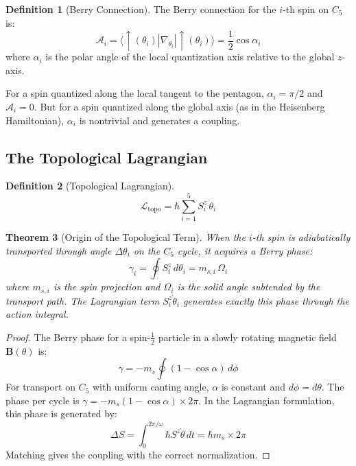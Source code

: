 \documentclass[11pt,a4paper]{article}
\newtheorem{theorem}{Theorem}[section]
\theoremstyle{definition}
\newtheorem{definition}[theorem]{Definition}
\theoremstyle{remark}
\newcommand{\LL}{\mathcal{L}}
\begin{document}
\begin{definition}[Berry Connection]
\label{def:berry}
The Berry connection for the $i$-th spin on $C_5$ is:
\begin{equation}
\mathcal{A}_i = \langle \uparrow(\theta_i) | \nabla_{\theta_i} | \uparrow(\theta_i) \rangle = \frac{1}{2}\cos\alpha_i
\end{equation}
where $\alpha_i$ is the polar angle of the local quantization axis relative to the global $z$-axis.
\end{definition}

For a spin quantized along the local tangent to the pentagon, $\alpha_i = \pi/2$ and $\mathcal{A}_i = 0$. But for a spin quantized along the global axis (as in the Heisenberg Hamiltonian), $\alpha_i$ is nontrivial and generates a coupling.

\subsection{The Topological Lagrangian}

\begin{definition}[Topological Lagrangian]
\label{def:Ltopo}
\begin{equation}
\boxed{\LL_{\mathrm{topo}} = \hbar\sum_{i=1}^{5} S_i^z\,\dot{\theta}_i}
\end{equation}
\end{definition}

\begin{theorem}[Origin of the Topological Term]
\label{thm:berry}
When the $i$-th spin is adiabatically transported through angle $\Delta\theta_i$ on the $C_5$ cycle, it acquires a Berry phase:
\begin{equation}
\gamma_i = \oint S_i^z\,d\theta_i = m_{s,i}\,\Omega_i
\end{equation}
where $m_{s,i}$ is the spin projection and $\Omega_i$ is the solid angle subtended by the transport path. The Lagrangian term $S_i^z\dot{\theta}_i$ generates exactly this phase through the action integral.
\end{theorem}

\begin{proof}
The Berry phase for a spin-$\frac{1}{2}$ particle in a slowly rotating magnetic field $\mathbf{B}(\theta)$ is:
\begin{equation}
\gamma = -m_s \oint (1 - \cos\alpha)\,d\phi
\end{equation}
For transport on $C_5$ with uniform canting angle, $\alpha$ is constant and $d\phi = d\theta$. The phase per cycle is $\gamma = -m_s(1-\cos\alpha) \times 2\pi$. In the Lagrangian formulation, this phase is generated by:
\begin{equation}
\Delta S = \int_0^{2\pi/\omega} \hbar S^z \dot{\theta}\, dt = \hbar m_s \times 2\pi
\end{equation}
Matching gives the coupling with the correct normalization.
\end{proof}
\end{document}
